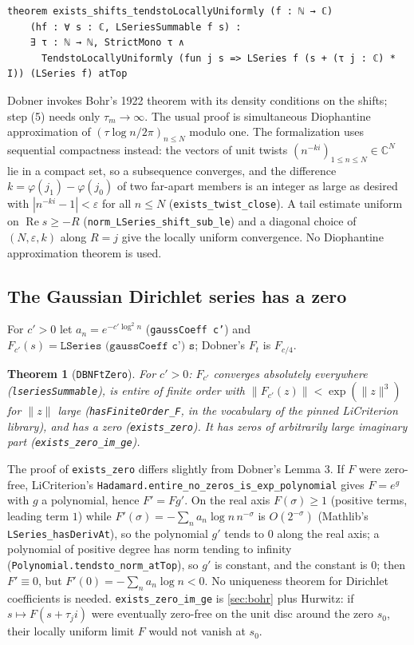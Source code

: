 \documentclass[11pt]{article}
\newtheorem{theorem}{Theorem}
\theoremstyle{definition}
\newcommand{\lean}[1]{\texttt{#1}}
\newcommand{\re}{\operatorname{Re}}
\newcommand{\C}{\mathbb{C}}
\begin{document}
\begin{lstlisting}
theorem exists_shifts_tendstoLocallyUniformly (f : ℕ → ℂ)
    (hf : ∀ s : ℂ, LSeriesSummable f s) :
    ∃ τ : ℕ → ℕ, StrictMono τ ∧
      TendstoLocallyUniformly (fun j s => LSeries f (s + (τ j : ℂ) * I)) (LSeries f) atTop
\end{lstlisting}

Dobner invokes Bohr's 1922 theorem \cite{Bo} with its density conditions on the shifts; step (5) needs only $\tau_m \to \infty$. The usual proof is simultaneous Diophantine approximation of $(\tau\log n/2\pi)_{n \le N}$ modulo one. The formalization uses sequential compactness instead: the vectors of unit twists $(n^{-ki})_{1 \le n \le N} \in \C^N$ lie in a compact set, so a subsequence converges, and the difference $k = \varphi(j_1) - \varphi(j_0)$ of two far-apart members is an integer as large as desired with $|n^{-ki} - 1| < \varepsilon$ for all $n \le N$ (\lean{exists\_twist\_close}). A tail estimate uniform on $\re s \ge -R$ (\lean{norm\_LSeries\_shift\_sub\_le}) and a diagonal choice of $(N, \varepsilon, k)$ along $R = j$ give the locally uniform convergence. No Diophantine approximation theorem is used.

\subsection{The Gaussian Dirichlet series has a zero}\label{sec:ftzero}

For $c' > 0$ let $a_n = e^{-c'\log^2 n}$ (\lean{gaussCoeff c'}) and $F_{c'}(s) = \lean{LSeries (gaussCoeff c') s}$; Dobner's $F_t$ is $F_{c/4}$.

\begin{theorem}[\lean{DBNFtZero}]
For $c' > 0$: $F_{c'}$ converges absolutely everywhere (\lean{lseriesSummable}), is entire of finite order with $\|F_{c'}(z)\| < \exp(\|z\|^3)$ for $\|z\|$ large (\lean{hasFiniteOrder\_F}, in the vocabulary of the pinned LiCriterion library), and has a zero (\lean{exists\_zero}). It has zeros of arbitrarily large imaginary part (\lean{exists\_zero\_im\_ge}).
\end{theorem}

The proof of \lean{exists\_zero} differs slightly from Dobner's Lemma 3. If $F$ were zero-free, LiCriterion's \lean{Hadamard.entire\_no\_zeros\_is\_exp\_polynomial} gives $F = e^{g}$ with $g$ a polynomial, hence $F' = F g'$. On the real axis $F(\sigma) \ge 1$ (positive terms, leading term $1$) while $F'(\sigma) = -\sum_n a_n \log n\, n^{-\sigma}$ is $O(2^{-\sigma})$ (Mathlib's \lean{LSeries\_hasDerivAt}), so the polynomial $g'$ tends to $0$ along the real axis; a polynomial of positive degree has norm tending to infinity (\lean{Polynomial.tendsto\_norm\_atTop}), so $g'$ is constant, and the constant is $0$; then $F' \equiv 0$, but $F'(0) = -\sum_n a_n\log n < 0$. No uniqueness theorem for Dirichlet coefficients is needed. \lean{exists\_zero\_im\_ge} is \cref{sec:bohr} plus Hurwitz: if $s \mapsto F(s + \tau_j i)$ were eventually zero-free on the unit disc around the zero $s_0$, their locally uniform limit $F$ would not vanish at $s_0$.
\end{document}
